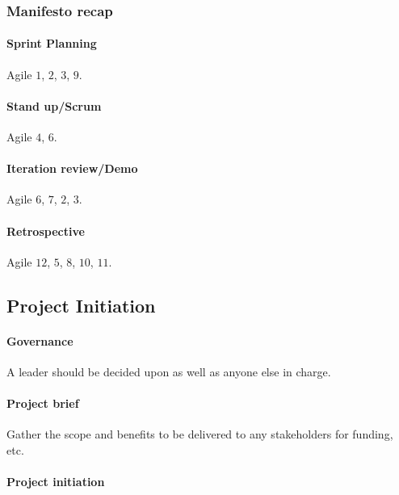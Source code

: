 \subsubsection{Manifesto recap}\label{ssub:manifesto_recap}

\paragraph{Sprint Planning}\label{par:sprint_planning}

Agile \(1\), \(2\), \(3\), \(9\).

\paragraph{Stand up/Scrum}\label{par:stand_up_scrum}

Agile \(4\), \(6\).

\paragraph{Iteration review/Demo}\label{par:iteration_review_demo}

Agile \(6\), \(7\), \(2\), \(3\).

\paragraph{Retrospective}\label{par:retrospective}

Agile \(12\), \(5\), \(8\), \(10\), \(11\).

\subsection{Project Initiation}\label{sub:project_initiation}

\paragraph{Governance}\label{par:governance}

A leader should be decided upon as well as anyone else in charge.

\paragraph{Project brief}\label{par:project_brief}

Gather the scope and benefits to be delivered to any stakeholders for funding, etc.

\paragraph{Project initiation}\label{par:project_initiation}

